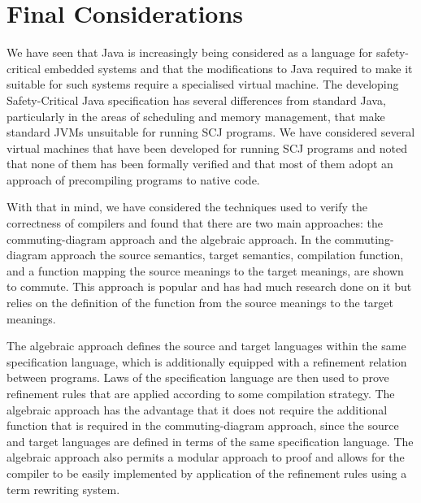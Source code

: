 
\section{Final Considerations}
\label{final-considerations-section}


We have seen that Java is increasingly being considered as a language
for safety-critical embedded systems and that the modifications to
Java required to make it suitable for such systems require a
specialised virtual machine.
The developing Safety-Critical Java specification has several
differences from standard Java, particularly in the areas of
scheduling and memory management, that make standard JVMs unsuitable
for running SCJ programs.
We have considered several virtual machines that have been developed
for running SCJ programs and noted that none of them has been formally
verified and that most of them adopt an approach of precompiling
programs to native code.

With that in mind, we have considered the techniques used to verify
the correctness of compilers and found that there are two main
approaches: the commuting-diagram approach and the algebraic approach.
In the commuting-diagram approach the source semantics, target
semantics, compilation function, and a function mapping the source
meanings to the target meanings, are shown to commute.
This approach is popular and has had much research done on it but
relies on the definition of the function from the source meanings to
the target meanings.

The algebraic approach defines the source and target languages within
the same specification language, which is additionally equipped with a
refinement relation between programs.
Laws of the specification language are then used to prove refinement
rules that are applied according to some compilation strategy.
The algebraic approach has the advantage that it does not require the
additional function that is required in the commuting-diagram
approach, since the source and target languages are defined in terms
of the same specification language.
The algebraic approach also permits a modular approach to proof and
allows for the compiler to be easily implemented by application of the
refinement rules using a term rewriting system.


